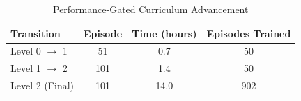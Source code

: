 \begin{table}[htbp]
\centering
\caption{Performance-Gated Curriculum Advancement}
\label{tab:curriculum_advancement}
\begin{tabular}{lccc}
\toprule
\textbf{Transition} & \textbf{Episode} & \textbf{Time (hours)} & \textbf{Episodes Trained} \\
\midrule
Level 0 $\rightarrow$ 1 & 51 & 0.7 & 50 \\
Level 1 $\rightarrow$ 2 & 101 & 1.4 & 50 \\
Level 2 (Final) & 101 & 14.0 & 902 \\
\bottomrule
\end{tabular}
\end{table}
